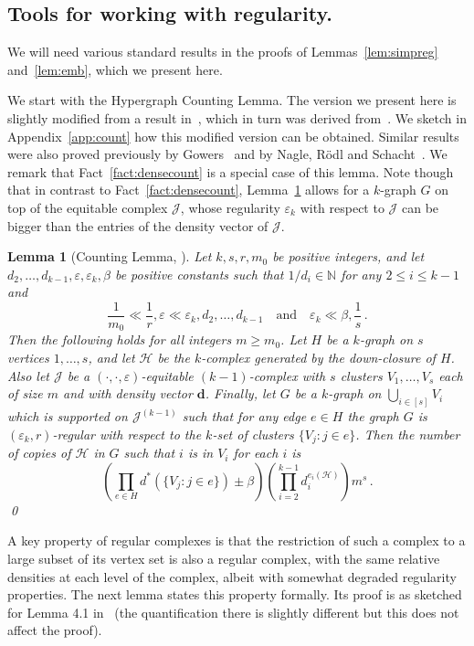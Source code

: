 \documentclass[12pt,a4paper]{amsart}
\let\eps\varepsilon
\newtheorem{lemma}[theorem] {Lemma}
\newcommand{\Hy}{\mathcal{H}}
\newcommand{\cJ}{\mathcal{J}}
\newcommand{\reld}{d^*}
\begin{document}
\subsection{Tools for working with regularity.}
We will need various standard results in the proofs of Lemmas~\ref{lem:simpreg}
and~\ref{lem:emb}, which we present here.

We start with the Hypergraph Counting Lemma. The version we present here is slightly modified from a result
in~\cite{CFKO}, which in turn was derived from~\cite[Theorem~9]{RS2}. We
sketch in Appendix~\ref{app:count} how this modified version can be obtained. Similar
results were also proved previously by Gowers~\cite{Gowers} and by Nagle, R\"odl and
Schacht~\cite{NRS}. We remark that Fact~\ref{fact:densecount} is a special case of this lemma. Note though that in contrast to Fact~\ref{fact:densecount}, Lemma~\ref{lem:count} allows for a $k$-graph $G$ on top of the equitable complex $\cJ$, whose regularity $\eps_k$ with respect to $\cJ$ can be bigger than the entries of the density vector of $\cJ$.

\begin{lemma}[Counting Lemma, {\cite[Lemma 4]{CFKO}}]\label{lem:count}
  Let $k,s,r,m_0$ be positive integers, and let
  $d_2,\ldots,d_{k-1},\eps,\eps_k,\beta$ be positive constants such that $1/d_i
  \in\mathbb{N}$ for any $2 \leq i \leq k-1$ and
  \[\frac{1}{m_0}\ll \frac{1}{r}, \eps \ll
  \eps_k,d_2,\ldots,d_{k-1}\quad\text{and}\quad \eps_k \ll
  \beta, \frac{1}{s}\,.\]
  Then the following holds for all
  integers $m\ge m_0$. Let $H$ be a $k$-graph on $s$ vertices $1, \ldots, s$,
  and let $\mathcal{H}$ be the $k$-complex generated by the down-closure of
  $H$.
Also let $\cJ$ be a $(\cdot, \cdot, \eps)$-equitable $(k-1)$-complex with $s$
clusters $V_1, \dots, V_s$ each of size $m$ and with density vector
$\mathbf{d}$. 
Finally, let $G$ be a $k$-graph on $\bigcup_{i \in [s]} V_i$ which is supported
on $\cJ^{(k-1)}$ such that for any edge $e \in H$ the graph $G$ is $(\eps_k,r)$-regular with respect to the $k$-set of clusters $\{V_j : j \in e\}$. Then the number
of copies of $\mathcal{H}$ in $G$ such that $i$ is in $V_i$ for each $i$ is
$$\left(\prod_{e \in H} \reld(\{V_j : j \in e\}) \pm \beta \right)\left(\prod_{i
= 2}^{k-1} d_i^{e_i(\Hy)}\right) m^s\,.$$
\qed
\end{lemma}


A key property of regular complexes is that the
restriction of such a complex to a large subset of its vertex set is also a
regular complex, with the same relative densities at each level of the complex, albeit
with somewhat degraded regularity properties. The next lemma states this property formally. Its proof is as sketched for Lemma 4.1 in~\cite{lcycles} (the quantification there is slightly different but this does not affect the proof).
\end{document}
